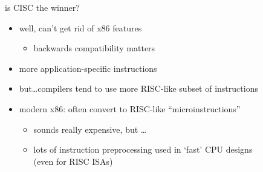 \begin{frame}{is CISC the winner?}
    \begin{itemize}
    \item well, can't get rid of x86 features
        \begin{itemize}
        \item backwards compatibility matters
        \end{itemize}
    \item more application-specific instructions
    \vspace{.5cm}
    \item but\ldots compilers tend to use more RISC-like subset of instructions
    \item modern x86: often convert to RISC-like ``microinstructions''
        \begin{itemize}
        \item sounds really expensive, but \ldots
        \item lots of instruction preprocessing used in `fast' CPU designs \\ (even for RISC ISAs)
        \end{itemize}
    \end{itemize}
\end{frame}
